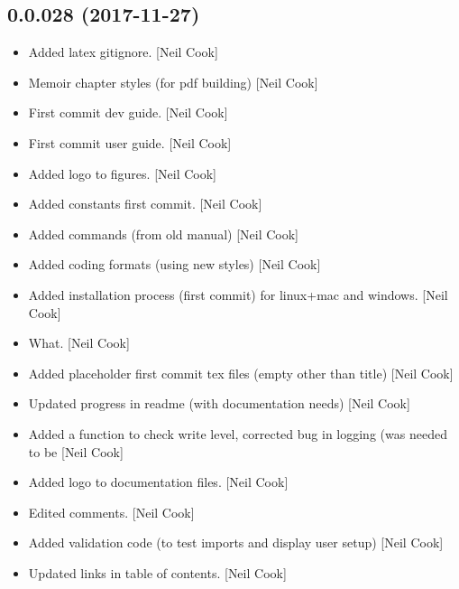 \documentclass[a4paper,10pt,english]{report}
\begin{document}
\subsection{0.0.028 (2017-11-27)}
\label{\detokenize{misc/changelog:id523}}\begin{itemize}
\item {} 
Added latex gitignore. {[}Neil Cook{]}

\item {} 
Memoir chapter styles (for pdf building) {[}Neil Cook{]}

\item {} 
First commit dev guide. {[}Neil Cook{]}

\item {} 
First commit user guide. {[}Neil Cook{]}

\item {} 
Added logo to figures. {[}Neil Cook{]}

\item {} 
Added constants first commit. {[}Neil Cook{]}

\item {} 
Added commands (from old manual) {[}Neil Cook{]}

\item {} 
Added coding formats (using new styles) {[}Neil Cook{]}

\item {} 
Added installation process (first commit) for linux+mac and windows.
{[}Neil Cook{]}

\item {} 
What. {[}Neil Cook{]}

\item {} 
Added placeholder first commit tex files (empty other than title)
{[}Neil Cook{]}

\item {} 
Updated progress in readme (with documentation needs) {[}Neil Cook{]}

\item {} 
Added a function to check write level, corrected bug in logging (was
 needed to be  {[}Neil Cook{]}

\item {} 
Added logo to documentation files. {[}Neil Cook{]}

\item {} 
Edited comments. {[}Neil Cook{]}

\item {} 
Added validation code (to test imports and display user setup) {[}Neil
Cook{]}

\item {} 
Updated links in table of contents. {[}Neil Cook{]}

\end{itemize}
\end{document}
